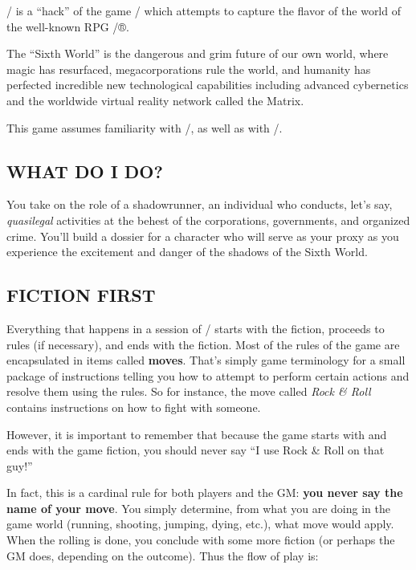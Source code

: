 \documentclass[oneside,10pt]{article}
\begin{document}
\begin{multicols}{2}

\SW/ is a ``hack'' of the game \DW/ which
attempts to capture the flavor of the world of the well-known
RPG \SR/®.

The ``Sixth World'' is the dangerous and grim future of our
own world, where magic has resurfaced, megacorporations
rule the world, and humanity has perfected incredible new
technological capabilities including advanced cybernetics and
the worldwide virtual reality network called the
Matrix.

This game assumes familiarity with \SR/, as well as
with \DW/.


\subsection{WHAT DO I DO?}

You take on the role of a shadowrunner, an individual who conducts,
let’s say, \textit{quasilegal} activities at the behest of the
corporations, governments, and organized crime. You’ll build a dossier
for a character who will serve as your proxy as you experience the
excitement and danger of the shadows of the Sixth World.


\subsection{FICTION FIRST}
\label{fictionfirst}

Everything that happens in a session of \SW/ starts with the fiction,
proceeds to rules (if necessary), and ends with the fiction. Most of
the rules of the game are encapsulated in items called
\textbf{moves}. That’s simply game terminology for a small package of
instructions telling you how to attempt to perform certain actions and
resolve them using the rules. So for instance, the move called
\textit{Rock \& Roll} contains instructions on how to fight with
someone.


However, it is important to remember that because the game starts with
and ends with the game fiction, you should never say ``I use Rock \&
Roll on that guy!''


In fact, this is a cardinal rule for both players and the GM:
\textbf{you never say the name of your move}. You simply determine,
from what you are doing in the game world (running, shooting, jumping,
dying, etc.), what move would apply. When the rolling is done, you
conclude with some more fiction (or perhaps the GM does, depending on
the outcome). Thus the flow of play is:


\end{multicols}
\end{document}
